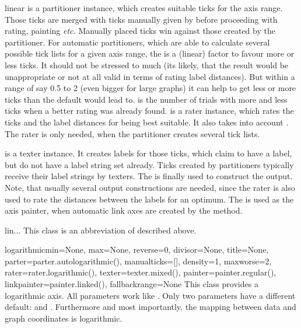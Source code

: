 \begin{classdesc}{linear}
   is a partitioner instance, which creates suitable ticks
  for the axis range. Those ticks are merged with ticks manually given 
  by  before proceeding with rating, painting
  \emph{etc.} Manually placed ticks win against those created by the
  partitioner. For automatic partitioners, which are able to calculate
  several possible tick lists for a given axis range, the
   is a (linear) factor to favour more or less ticks. It
  should not be stressed to much (its likely, that the result would be
  unappropriate or not at all valid in terms of rating label
  distances). But within a range of say 0.5 to 2 (even bigger for
  large graphs) it can help to get less or more ticks than the default
  would lead to.  is the number of trials with more
  and less ticks when a better rating was already found. 
  is a rater instance, which rates the ticks and the label distances
  for being best suitable. It also takes into account .
  The rater is only needed, when the partitioner creates several tick
  lists.

   is a texter instance. It creates labels for those
  ticks, which claim to have a label, but do not have a label string
  set already. Ticks created by partitioners typically receive their
  label strings by texters. The  is finally used to
  construct the output. Note, that usually several output
  constructions are needed, since the rater is also used to rate the
  distances between the labels for an optimum. The 
  is used as the axis painter, when automatic link axes are created by
  the  method.
\end{classdesc}

\begin{classdesc}{lin}{...}
  This class is an abbreviation of  described above.
\end{classdesc}

\begin{classdesc}{logarithmic}{min=None, max=None, reverse=0, divisor=None, title=None,
                               parter=parter.autologarithmic(), manualticks=[],
                               density=1, maxworse=2, rater=rater.logarithmic(),
                               texter=texter.mixed(), painter=painter.regular(),
                               linkpainter=painter.linked(), fallbackrange=None}
  This class provides a logarithmic axis. All parameters work like
  . Only two parameters have a different default:
   and . Furthermore and most importantly, the
  mapping between data and graph coordinates is logarithmic.
\end{classdesc}

